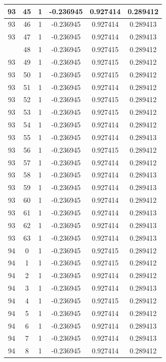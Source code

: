 \documentclass[12pt,a4paper]{article}
\numberwithin{equation}{section}
\numberwithin{figure}{section}
\numberwithin{table}{section}
\begin{document}
\begin{longtable}{|c|c|c|c|c|c|}
93 & 45 & 1 & -0.236945 & 0.927414 & 0.289412 \\ \hline
93 & 46 & 1 & -0.236945 & 0.927414 & 0.289413 \\ \hline
93 & 47 & 1 & -0.236945 & 0.927414 & 0.289413 \\ \hline
\pagebreak
93 & 48 & 1 & -0.236945 & 0.927415 & 0.289412 \\ \hline
93 & 49 & 1 & -0.236945 & 0.927415 & 0.289412 \\ \hline
93 & 50 & 1 & -0.236945 & 0.927415 & 0.289412 \\ \hline
93 & 51 & 1 & -0.236945 & 0.927414 & 0.289412 \\ \hline
93 & 52 & 1 & -0.236945 & 0.927415 & 0.289412 \\ \hline
93 & 53 & 1 & -0.236945 & 0.927415 & 0.289412 \\ \hline
93 & 54 & 1 & -0.236945 & 0.927414 & 0.289412 \\ \hline
93 & 55 & 1 & -0.236945 & 0.927414 & 0.289413 \\ \hline
93 & 56 & 1 & -0.236945 & 0.927415 & 0.289412 \\ \hline
93 & 57 & 1 & -0.236945 & 0.927414 & 0.289412 \\ \hline
93 & 58 & 1 & -0.236945 & 0.927414 & 0.289413 \\ \hline
93 & 59 & 1 & -0.236945 & 0.927414 & 0.289413 \\ \hline
93 & 60 & 1 & -0.236945 & 0.927414 & 0.289412 \\ \hline
93 & 61 & 1 & -0.236945 & 0.927414 & 0.289413 \\ \hline
93 & 62 & 1 & -0.236945 & 0.927414 & 0.289413 \\ \hline
93 & 63 & 1 & -0.236945 & 0.927414 & 0.289413 \\ \hline
94 & 0 & 1 & -0.236945 & 0.927415 & 0.289412 \\ \hline
94 & 1 & 1 & -0.236945 & 0.927415 & 0.289412 \\ \hline
94 & 2 & 1 & -0.236945 & 0.927414 & 0.289412 \\ \hline
94 & 3 & 1 & -0.236945 & 0.927414 & 0.289413 \\ \hline
94 & 4 & 1 & -0.236945 & 0.927415 & 0.289412 \\ \hline
94 & 5 & 1 & -0.236945 & 0.927414 & 0.289412 \\ \hline
94 & 6 & 1 & -0.236945 & 0.927414 & 0.289413 \\ \hline
94 & 7 & 1 & -0.236945 & 0.927414 & 0.289413 \\ \hline
94 & 8 & 1 & -0.236945 & 0.927414 & 0.289412 \\ \hline

\end{longtable}
\end{document}
